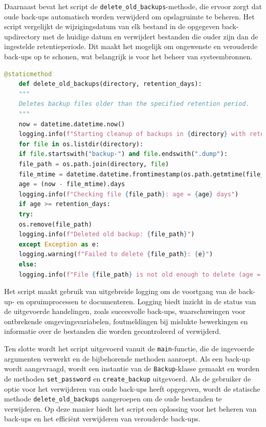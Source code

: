 Daarnaast bevat het script de \texttt{delete\_old\_backups}-methode, die ervoor zorgt dat oude back-ups automatisch worden verwijderd om opslagruimte te beheren. Het script vergelijkt de wijzigingsdatum van elk bestand in de opgegeven back-updirectory met de huidige datum en verwijdert bestanden die ouder zijn dan de ingestelde retentieperiode. Dit maakt het mogelijk om ongewenste en verouderde back-ups op te schonen, wat belangrijk is voor het beheer van systeembronnen.
\begin{lstlisting}[language=Python]
    @staticmethod
    def delete_old_backups(directory, retention_days):
    """
    Deletes backup files older than the specified retention period.
    """
    now = datetime.datetime.now()
    logging.info(f"Starting cleanup of backups in {directory} with retention period: {retention_days} days")
    for file in os.listdir(directory):
    if file.startswith("backup-") and file.endswith(".dump"):
    file_path = os.path.join(directory, file)
    file_mtime = datetime.datetime.fromtimestamp(os.path.getmtime(file_path))
    age = (now - file_mtime).days
    logging.info(f"Checking file {file_path}: age = {age} days")
    if age >= retention_days:
    try:
    os.remove(file_path)
    logging.info(f"Deleted old backup: {file_path}")
    except Exception as e:
    logging.warning(f"Failed to delete {file_path}: {e}")
    else:
    logging.info(f"File {file_path} is not old enough to delete (age = {age} days).")
\end{lstlisting}

Het script maakt gebruik van uitgebreide logging om de voortgang van de back-up- en opruimprocessen te documenteren. Logging biedt inzicht in de status van de uitgevoerde handelingen, zoals succesvolle back-ups, waarschuwingen voor ontbrekende omgevingsvariabelen, foutmeldingen bij mislukte bewerkingen en informatie over de bestanden die worden gecontroleerd of verwijderd.

Ten slotte wordt het script uitgevoerd vanuit de \texttt{main}-functie, die de ingevoerde argumenten verwerkt en de bijbehorende methoden aanroept. Als een back-up wordt aangevraagd, wordt een instantie van de \texttt{Backup}-klasse gemaakt en worden de methoden \texttt{set\_password} en \texttt{create\_backup} uitgevoerd. Als de gebruiker de optie voor het verwijderen van oude back-ups heeft opgegeven, wordt de statische methode \texttt{delete\_old\_backups} aangeroepen om de oude bestanden te verwijderen. Op deze manier biedt het script een oplossing voor het beheren van back-ups en het efficiënt verwijderen van verouderde back-ups.

